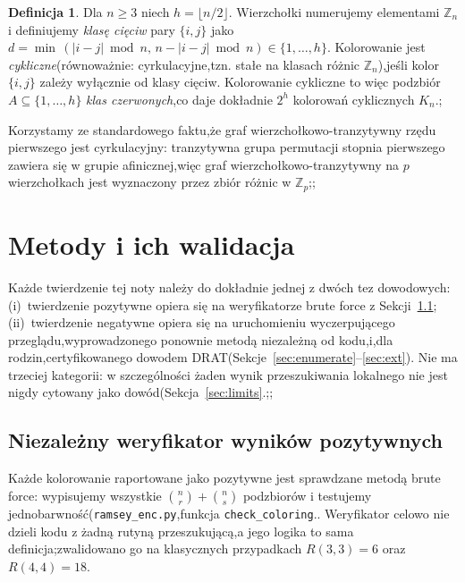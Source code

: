 \documentclass[11pt]{article}
\theoremstyle{definition}
\newtheorem{definition}[theorem]{Definicja}
\theoremstyle{plain}
\newcommand{\K}{\ensuremath{K}}
\newcommand{\R}[2]{\ensuremath{R(#1,#2)}}
\newcommand{\Zn}{\ensuremath{\mathbb{Z}_n}}
\newcommand{\Zp}{\ensuremath{\mathbb{Z}_p}}
\begin{document}
\begin{definition}
Dla $n \ge 3$ niech $h = \lfloor n/2 \rfloor$. Wierzchołki numerujemy elementami $\Zn$ i definiujemy \emph{klasę cięciw} pary $\{i,j\}$ jako $d = \min\,(|i-j| \bmod n,\, n - |i-j| \bmod n) \in \{1,\dots,h\}$. Kolorowanie jest \emph{cykliczne}(równoważnie: cyrkulacyjne,tzn. stałe na klasach różnic $\Zn$),jeśli kolor $\{i,j\}$ zależy wyłącznie od klasy cięciw. Kolorowanie cykliczne to więc podzbiór $A \subseteq \{1,\dots,h\}$ \emph{klas czerwonych},co daje dokładnie $2^{h}$ kolorowań cyklicznych $\K_n$.;\end{definition}



Korzystamy ze standardowego faktu,że graf wierzchołkowo-tranzytywny rzędu pierwszego jest cyrkulacyjny: tranzytywna grupa permutacji stopnia pierwszego zawiera się w grupie afinicznej,więc graf wierzchołkowo-tranzytywny na $p$ wierzchołkach jest wyznaczony przez zbiór różnic w $\Zp$;;



\section{Metody i ich walidacja}\label{sec:methods}



Każde twierdzenie tej noty należy do dokładnie jednej z dwóch tez dowodowych:(i)~twierdzenie pozytywne opiera się na weryfikatorze brute force z Sekcji~\ref{sec:verifier};(ii)~twierdzenie negatywne opiera się na uruchomieniu wyczerpującego przeglądu,wyprowadzonego ponownie metodą niezależną od kodu,i,dla rodzin,certyfikowanego dowodem DRAT(Sekcje~\ref{sec:enumerate}--\ref{sec:ext}). Nie ma trzeciej kategorii: w szczególności żaden wynik przeszukiwania lokalnego nie jest nigdy cytowany jako dowód(Sekcja~\ref{sec:limits}.;;



\subsection{Niezależny weryfikator wyników pozytywnych}\label{sec:verifier}
Każde kolorowanie raportowane jako pozytywne jest sprawdzane metodą brute force: wypisujemy wszystkie $\binom{n}{r} + \binom{n}{s}$ podzbiorów i testujemy jednobarwność(\texttt{ramsey\_enc.py},funkcja \texttt{check\_coloring}.. Weryfikator celowo nie dzieli kodu z żadną rutyną przeszukującą,a jego logika to sama definicja;zwalidowano go na klasycznych przypadkach $\R{3}{3} = 6$ oraz $\R{4}{4} = 18$.
\end{document}
